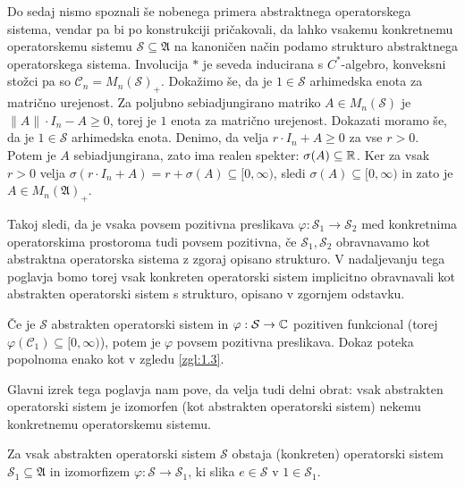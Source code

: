 Do sedaj nismo spoznali še nobenega primera abstraktnega operatorskega sistema,
vendar pa bi po konstrukciji pričakovali, da lahko vsakemu 
konkretnemu operatorskemu sistemu $\mathcal{S} \subseteq \mathfrak{A}$ na kanoničen način podamo strukturo abstraktnega operatorskega sistema.
Involucija $*$ je seveda inducirana s $C^*$-algebro, konveksni stožci pa so $\mathcal{C}_n = M_n (\mathcal{S})_+$.
Dokažimo še, da je $1 \in \mathcal{S}$ arhimedska enota za matrično urejenost.
Za poljubno sebiadjungirano matriko $A \in M_n (\mathcal{S})$ je $\| A\| \cdot I_n - A \geq 0$, torej je $1$ enota za matrično urejenost.
Dokazati moramo še, da je $1 \in \mathcal{S}$ arhimedska enota.
Denimo, da velja $r \cdot I_n + A \geq 0$ za vse $r > 0$. 
Potem je $A$ sebiadjungirana, zato ima realen spekter: $\sigma(A) \subseteq \mathbb R$.
Ker za vsak $r > 0$ velja $\sigma(r \cdot I_n + A) = r + \sigma(A) \subseteq [0, \infty)$,
sledi $\sigma(A) \subseteq [0, \infty)$ in zato je $A \in M_n (\mathfrak{A})_+$.

Takoj sledi, da je vsaka povsem pozitivna preslikava $\varphi: \mathcal{S}_1 \to \mathcal{S}_2$ med konkretnima operatorskima prostoroma tudi povsem pozitivna,
če $\mathcal{S}_1, \mathcal{S}_2$ obravnavamo kot abstraktna operatorska sistema z zgoraj opisano strukturo.
V nadaljevanju tega poglavja bomo torej vsak konkreten operatorski sistem implicitno obravnavali kot abstrakten operatorski sistem s strukturo, opisano v zgornjem odstavku.

\begin{zgled}
    Če je $\mathcal{S}$ abstrakten operatorski sistem in $\varphi: \mathcal{S} \to \mathbb C$
    pozitiven funkcional (torej $\varphi (\mathcal{C}_1) \subseteq [0, \infty)$),
    potem je $\varphi$ povsem pozitivna preslikava. Dokaz poteka popolnoma enako kot v zgledu \ref{zgl:1.3}.
\end{zgled}

Glavni izrek tega poglavja nam pove, da velja tudi delni obrat: vsak abstrakten operatorski sistem je izomorfen (kot abstrakten operatorski sistem)
nekemu konkretnemu operatorskemu sistemu.

\begin{izrek}\label{izr:choi-effros}
    Za vsak abstrakten operatorski sistem $\mathcal{S}$ obstaja (konkreten) operatorski sistem $\mathcal{S}_1 \subseteq \mathfrak{A}$
    in izomorfizem $\varphi: \mathcal{S} \to \mathcal{S}_1$, ki slika $e \in \mathcal{S}$ v $1 \in \mathcal{S}_1$.
\end{izrek}

